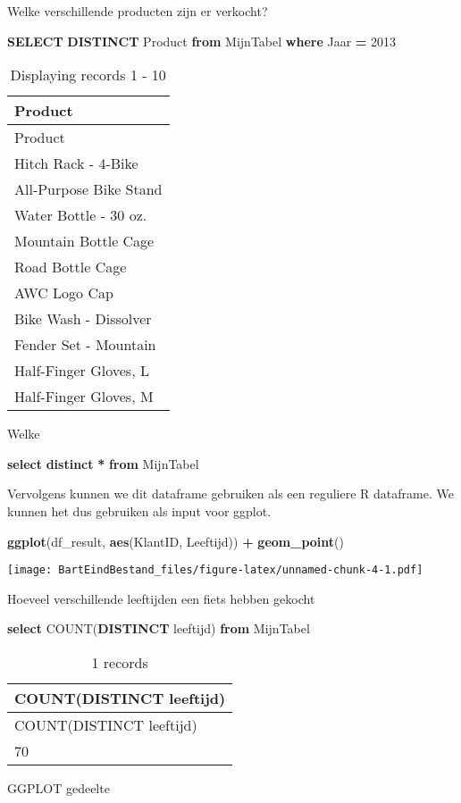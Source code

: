 \documentclass[]{article}
\newenvironment{Shaded}{\begin{snugshade}}{\end{snugshade}}
\newcommand{\DecValTok}[1]{\textcolor[rgb]{0.00,0.00,0.81}{#1}}
\newcommand{\FunctionTok}[1]{\textcolor[rgb]{0.00,0.00,0.00}{#1}}
\newcommand{\KeywordTok}[1]{\textcolor[rgb]{0.13,0.29,0.53}{\textbf{#1}}}
\newcommand{\NormalTok}[1]{#1}
\newcommand{\OperatorTok}[1]{\textcolor[rgb]{0.81,0.36,0.00}{\textbf{#1}}}
\newcommand{\StringTok}[1]{\textcolor[rgb]{0.31,0.60,0.02}{#1}}
\begin{document}
Welke verschillende producten zijn er verkocht?

\begin{Shaded}
\begin{Highlighting}[]
\KeywordTok{SELECT} \KeywordTok{DISTINCT}\NormalTok{ Product}
\KeywordTok{from}\NormalTok{ MijnTabel}
\KeywordTok{where}\NormalTok{ Jaar }\OperatorTok{=} \DecValTok{2013}
\end{Highlighting}
\end{Shaded}

\begin{longtable}[]{@{}l@{}}
\caption{Displaying records 1 - 10}\tabularnewline
\toprule
Product\tabularnewline
\midrule
\endfirsthead
\toprule
Product\tabularnewline
\midrule
\endhead
Hitch Rack - 4-Bike\tabularnewline
All-Purpose Bike Stand\tabularnewline
Water Bottle - 30 oz.\tabularnewline
Mountain Bottle Cage\tabularnewline
Road Bottle Cage\tabularnewline
AWC Logo Cap\tabularnewline
Bike Wash - Dissolver\tabularnewline
Fender Set - Mountain\tabularnewline
Half-Finger Gloves, L\tabularnewline
Half-Finger Gloves, M\tabularnewline
\bottomrule
\end{longtable}

Welke

\begin{Shaded}
\begin{Highlighting}[]
\KeywordTok{select} \KeywordTok{distinct} \OperatorTok{*}
\KeywordTok{from}\NormalTok{ MijnTabel}
\end{Highlighting}
\end{Shaded}

Vervolgens kunnen we dit dataframe gebruiken als een reguliere R
dataframe. We kunnen het dus gebruiken als input voor ggplot.

\begin{Shaded}
\begin{Highlighting}[]
\KeywordTok{ggplot}\NormalTok{(df_result, }\KeywordTok{aes}\NormalTok{(KlantID, Leeftijd)) }\OperatorTok{+}
\StringTok{  }\KeywordTok{geom_point}\NormalTok{()}
\end{Highlighting}
\end{Shaded}

\texttt{[image: BartEindBestand\_files/figure-latex/unnamed-chunk-4-1.pdf]}

Hoeveel verschillende leeftijden een fiets hebben gekocht

\begin{Shaded}
\begin{Highlighting}[]
\KeywordTok{select} \FunctionTok{COUNT}\NormalTok{(}\KeywordTok{DISTINCT}\NormalTok{ leeftijd)}
\KeywordTok{from}\NormalTok{ MijnTabel}
\end{Highlighting}
\end{Shaded}

\begin{longtable}[]{@{}l@{}}
\caption{1 records}\tabularnewline
\toprule
COUNT(DISTINCT leeftijd)\tabularnewline
\midrule
\endfirsthead
\toprule
COUNT(DISTINCT leeftijd)\tabularnewline
\midrule
\endhead
70\tabularnewline
\bottomrule
\end{longtable}

GGPLOT gedeelte
\end{document}
